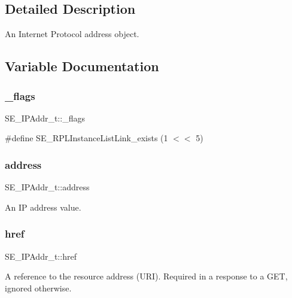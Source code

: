 \subsection{Detailed Description}
An Internet Protocol address object. 

\subsection{Variable Documentation}
\mbox{\label{group__IPAddr_ga557111ee3a94eb2e68cf42e62bfba40a}} 
\subsubsection{\texorpdfstring{\+\_\+flags}{\_flags}}
{\footnotesize\ttfamily S\+E\+\_\+\+I\+P\+Addr\+\_\+t\+::\+\_\+flags}

\#define S\+E\+\_\+\+R\+P\+L\+Instance\+List\+Link\+\_\+exists (1 $<$$<$ 5) \mbox{\label{group__IPAddr_gabca0c11bd5af2bce6a3d2537dff98fe3}} 
\subsubsection{\texorpdfstring{address}{address}}
{\footnotesize\ttfamily S\+E\+\_\+\+I\+P\+Addr\+\_\+t\+::address}

An IP address value. \mbox{\label{group__IPAddr_ga3cd3e44c3eb563d397ff73361448715a}} 
\subsubsection{\texorpdfstring{href}{href}}
{\footnotesize\ttfamily S\+E\+\_\+\+I\+P\+Addr\+\_\+t\+::href}

A reference to the resource address (U\+RI). Required in a response to a G\+ET, ignored otherwise. 